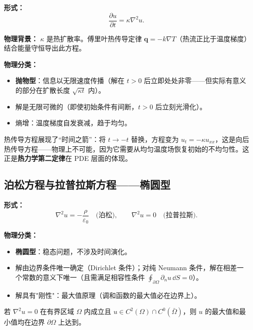 \textbf{形式：}
\begin{equation}
\frac{\partial u}{\partial t} = \kappa \nabla^2 u.
\label{eq:heat}
\end{equation}

\textbf{物理背景：} $\kappa$ 是热扩散率。傅里叶热传导定律 $\mathbf{q} = -k\nabla T$（热流正比于温度梯度）结合能量守恒导出此方程。

\textbf{物理分类：}
\begin{itemize}
\item \textbf{抛物型}：信息以无限速度传播（解在 $t>0$ 后立即处处非零——但实际有意义的部分在扩散长度 $\sqrt{\kappa t}$ 内）。
\item 解是无限可微的（即使初始条件有间断，$t>0$ 后立刻光滑化）。
\item 熵增：温度梯度自发衰减，趋于均匀。
\end{itemize}

\begin{insight}[抛物型方程的物理直觉]
热传导方程展现了“时间之箭”：将 $t\to -t$ 替换，方程变为 $u_t = -\kappa u_{xx}$，这是向后热传导方程——物理上不可能，因为它需要从均匀温度场恢复初始的不均匀性。这正是\textbf{热力学第二定律}在 PDE 层面的体现。
\end{insight}

\subsection{泊松方程与拉普拉斯方程——椭圆型}

\textbf{形式：}
\begin{equation}
\nabla^2 u = -\frac{\rho}{\varepsilon_0}\quad\text{(泊松)},\qquad
\nabla^2 u = 0\quad\text{(拉普拉斯)}.
\label{eq:poisson_laplace}
\end{equation}

\textbf{物理分类：}
\begin{itemize}
\item \textbf{椭圆型}：稳态问题，不涉及时间演化。
\item 解由边界条件唯一确定（Dirichlet 条件）；对纯 Neumann 条件，解在相差一个常数的意义下唯一（且需满足相容性条件 $\oint_{\partial\Omega}\partial_n u\,\dd S = 0$）。
\item 解具有"刚性"：最大值原理（调和函数的最大值必在边界上）。
\end{itemize}

\begin{theorem}[最大值原理]
若 $\nabla^2 u = 0$ 在有界区域 $\Omega$ 内成立且 $u\in C^2(\Omega)\cap C^0(\bar\Omega)$，则 $u$ 的最大值和最小值均在边界 $\partial\Omega$ 上达到。
\end{theorem}

